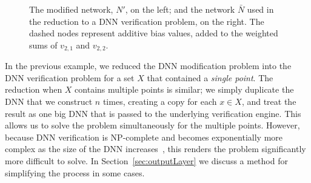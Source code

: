 \documentclass{easychair}
\begin{document}
\begin{figure}[htp]
\begin{subfigure}{0.5\linewidth}
  \end{subfigure}
  \caption{The modified network, $N'$, on the left; and the network
    $\bar{N}$ used in the reduction to a DNN verification problem, on
    the right. The dashed nodes represent additive bias values, added
    to the weighted sums of $v_{2,1}$ and $v_{2,2}$.}
    \label{fig:changeJustOneLayer}
\end{figure}

In the previous example, we reduced the DNN modification problem into
the DNN verification problem for a set $X$ that contained a
\emph{single point}. The reduction when $X$ contains multiple points
is similar; we simply duplicate the DNN that we construct $n$ times,
creating a copy for each $x\in X$, and treat the result as one big DNN
that is passed to the underlying verification engine. This allows us
to solve the problem simultaneously for the multiple points. However,
because DNN verification is NP-complete and becomes exponentially more
complex as the size of the DNN increases~\cite{KaBaDiJuKo17Reluplex},
this renders the problem significantly more difficult to solve. In
Section~\ref{sec:outputLayer} we discuss a method for simplifying the
process in some cases.
\end{document}
